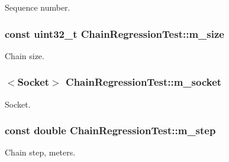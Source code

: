 Sequence number. 

\subsubsection[{\texorpdfstring{m\+\_\+size}{m_size}}]{\setlength{\rightskip}{0pt plus 5cm}const uint32\+\_\+t Chain\+Regression\+Test\+::m\+\_\+size\hspace{0.3cm}{\ttfamily [private]}}\hypertarget{classChainRegressionTest_a0b140f49f0f8bad41cba6bd2c68c11b8}{}\label{classChainRegressionTest_a0b140f49f0f8bad41cba6bd2c68c11b8}


Chain size. 

\subsubsection[{\texorpdfstring{m\+\_\+socket}{m_socket}}]{$<${\bf Socket}$>$ Chain\+Regression\+Test\+::m\+\_\+socket\hspace{0.3cm}{\ttfamily [private]}}\hypertarget{classChainRegressionTest_ad5f524009bcd54ac069a4a6b9d58bcd0}{}\label{classChainRegressionTest_ad5f524009bcd54ac069a4a6b9d58bcd0}


Socket. 

\subsubsection[{\texorpdfstring{m\+\_\+step}{m_step}}]{\setlength{\rightskip}{0pt plus 5cm}const double Chain\+Regression\+Test\+::m\+\_\+step\hspace{0.3cm}{\ttfamily [private]}}\hypertarget{classChainRegressionTest_a9700cff3675b8d166d41e4d479a1c3ac}{}\label{classChainRegressionTest_a9700cff3675b8d166d41e4d479a1c3ac}


Chain step, meters. 

